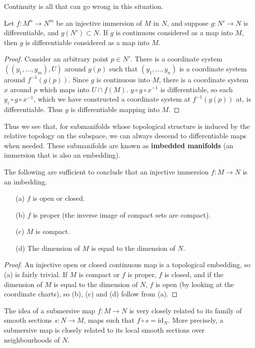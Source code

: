 Continuity is all that can go wrong in this situation.

\begin{theorem}
    Let $f:M^n \to N^m$ be an injective immersion of $M$ in $N$, and suppose $g: N' \to N$ is differentiable, and $g(N') \subset N$. If $g$ is continuous considered as a map into $M$, then $g$ is differentiable considered as a map into $M$.
\end{theorem}
\begin{proof}
    Consider an arbitrary point $p \in N'$. There is a coordinate system $((y_1, \dots, y_m),U)$ around $g(p)$ such that $(y_1, \dots, y_n)$ is a coordinate system around $f^{-1}(g(p))$. Since $g$ is continuous into $M$, there is a coordinate system $x$ around $p$ which maps into $U \cap f(M)$. $y \circ g \circ x^{-1}$ is differentiable, so each $y_i \circ g \circ x^{-1}$, which we have constructed a coordinate system at $f^{-1}(g(p))$ at, is differentiable. Thus $g$ is differentiable mapping into $M$.
\end{proof}

Thus we see that, for submanifolds whose topological structure is induced by the relative topology on the subspace, we can always descend to differentiable maps when needed. These submanifolds are known as {\bf imbedded manifolds} (an immersion that is also an embedding).

\begin{theorem}
    The following are sufficient to conclude that an injective immersion $f: M \to N$ is an imbedding.
    \begin{enumerate}
        \item[(a)] $f$ is open or closed.
        \item[(b)] $f$ is proper (the inverse image of compact sets are compact).
        \item[(c)] $M$ is compact.
        \item[(d)] The dimension of $M$ is equal to the dimension of $N$.
    \end{enumerate}
\end{theorem}
\begin{proof}
    An injective open or closed continuous map is a topological embedding, so (a) is fairly trivial. If $M$ is compact or $f$ is proper, $f$ is closed, and if the dimension of $M$ is equal to the dimension of $N$, $f$ is open (by looking at the coordinate charts), so (b), (c) and (d) follow from (a).
\end{proof}

The idea of a submersive map $f: M \to N$ is very closely related to its family of smooth sections $s: N \to M$, maps such that $f \circ s = \text{id}_N$. More precisely, a submersive map is closely related to its local smooth sections over neighbourhoods of $N$.

